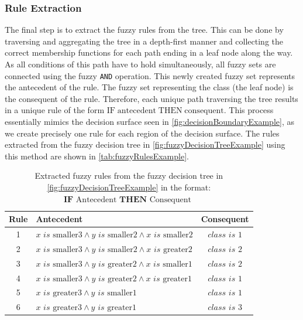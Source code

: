 \subsubsection{Rule Extraction}

The final step is to extract the fuzzy rules from the tree. This can be done by traversing and aggregating the tree in a depth-first manner and collecting the correct membership functions for each path ending in a leaf node along the way. As all conditions of this path have to hold simultaneously, all fuzzy sets are connected using the fuzzy \texttt{AND} operation. This newly created fuzzy set represents the antecedent of the rule. The fuzzy set representing the class (the leaf node) is the consequent of the rule. Therefore, each unique path traversing the tree results in a unique rule of the form \emph{$\text{IF} \; \text{antecedent} \; \text{THEN} \; \text{consequent}$}. This process essentially mimics the decision surface seen in \autoref{fig:decisionBoundaryExample}, as we create precisely one rule for each region of the decision surface. The rules extracted from the fuzzy decision tree in \autoref{fig:fuzzyDecisionTreeExample} using this method are shown in \autoref{tab:fuzzyRulesExample}.


\newcommand{\is}{\textit{ is }}


\begin{table}[H]
    \centering
    \begin{tabular}{c|l|c}
        \textbf{Rule} & \textbf{Antecedent}                                                             & \textbf{Consequent} \\
        \hline
        1             & $x \is \text{smaller3} \land y \is \text{smaller2} \land x \is \text{smaller2}$ & $class \is 1$       \\
        2             & $x \is \text{smaller3} \land y \is \text{smaller2} \land x \is \text{greater2}$ & $class \is 2$       \\
        3             & $x \is \text{smaller3} \land y \is \text{greater2} \land x \is \text{smaller1}$ & $class \is 2$       \\
        4             & $x \is \text{smaller3} \land y \is \text{greater2} \land x \is \text{greater1}$ & $class \is 1$       \\
        5             & $x \is \text{greater3} \land y \is \text{smaller1}$                             & $class \is 1$       \\
        6             & $x \is \text{greater3} \land y \is \text{greater1}$                             & $class \is 3$       \\
    \end{tabular}
    \caption[Extracted fuzzy rules from the example fuzzy decision tree]{Extracted fuzzy rules from the fuzzy decision tree in \autoref{fig:fuzzyDecisionTreeExample} in the format: $\textbf{IF} \text{ Antecedent } \textbf{THEN} \text{ Consequent }$}
    \label{tab:fuzzyRulesExample}
\end{table}

